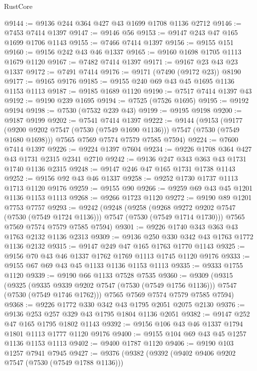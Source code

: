 \begin{lexlean}{RustCore}
\begin{coremodule}
@9144 := @9136 @244 @364 @427 @43 @1699 @1708 @1136 @2712
@9146 := @7453 @7414 @1397
@9147 := @9146 @56
@9153 := @9147 @243 @47 @165 @1699 @1706 @1143
@9155 := @7466 @7414 @1397
@9156 := @9155 @151
@9160 := @9156 @242 @43 @46 @1337
@9165 := @9160 @1698 @1705 @1113 @1679 @1120
@9167 := @7482 @7414 @1397
@9171 := @9167 @23 @43 @23 @1337
@9172 := @7491 @7414
@9176 := @9171 (@7490 (@9172 @23)) @8190
@9177 := @9165 @9176
@9185 := @9155 @240 @69 @43 @45 @1695 @1136 @1153 @1113
@9187 := @9185 @1689 @1120
@9190 := @7517 @7414 @1397 @43
@9192 := @9190 @239 @1695
@9194 := @7525 (@7526 @1695)
@9195 := @9192 @9194
@9198 := @7530 (@7532 @239 @43)
@9199 := @9195 @9198
@9200 := @9187 @9199
@9202 := @7541 @7414 @1397
@9222 := @9144
    (@9153
      (@9177 (@9200 @9202 @7547 (@7530 (@7549 @1690 @1136))) @7547 (@7530 (@7549 @1680 @1698)))
      @7565
      @7569
      @7574
      @7579
      @7585
      @7594)
@9224 := @7600 @7414 @1397
@9226 := @9224 @1397 @7604
@9234 := @9226 @1708 @364 @427 @43 @1731 @2315 @2341 @2710
@9242 := @9136 @247 @343 @363 @43 @1731 @1740 @1136 @2315
@9248 := @9147 @246 @47 @165 @1731 @1738 @1143
@9252 := @9156 @92 @43 @46 @1337
@9258 := @9252 @1730 @1737 @1113 @1713 @1120 @9176
@9259 := @9155 @90
@9266 := @9259 @69 @43 @45 @1201 @1136 @1153 @1113
@9268 := @9266 @1723 @1120
@9272 := @9190 @89 @1201 @7753 @7757
@9293 := @9242
    (@9248
      (@9258
        (@9268 @9272 @9202 @7547 (@7530 (@7549 @1724 @1136)))
        @7547
        (@7530 (@7549 @1714 @1730)))
      @7565
      @7569
      @7574
      @7579
      @7585
      @7594)
@9301 := @9226 @1740 @343 @363 @43 @1763 @2132 @1136 @2313
@9309 := @9136 @250 @330 @342 @43 @1763 @1772 @1136 @2132
@9315 := @9147 @249 @47 @165 @1763 @1770 @1143
@9325 := @9156 @70 @43 @46 @1337 @1762 @1769 @1113 @1745 @1120 @9176
@9333 := @9155 @67 @69 @43 @45 @1133 @1136 @1153 @1113
@9335 := @9333 @1755 @1120
@9339 := @9190 @66 @1133 @7528 @7535
@9360 := @9309
    (@9315
      (@9325
        (@9335 @9339 @9202 @7547 (@7530 (@7549 @1756 @1136)))
        @7547
        (@7530 (@7549 @1746 @1762)))
      @7565
      @7569
      @7574
      @7579
      @7585
      @7594)
@9368 := @9226 @1772 @330 @342 @43 @1795 @2051 @2075 @2130
@9376 := @9136 @253 @257 @329 @43 @1795 @1804 @1136 @2051
@9382 := @9147 @252 @47 @165 @1795 @1802 @1143
@9392 := @9156 @106 @43 @46 @1337 @1794 @1801 @1113 @1777 @1120 @9176
@9400 := @9155 @104 @69 @43 @45 @1257 @1136 @1153 @1113
@9402 := @9400 @1787 @1120
@9406 := @9190 @103 @1257 @7941 @7945
@9427 := @9376
    (@9382
      (@9392
        (@9402 @9406 @9202 @7547 (@7530 (@7549 @1788 @1136)))

\end{coremodule}
\end{lexlean}
